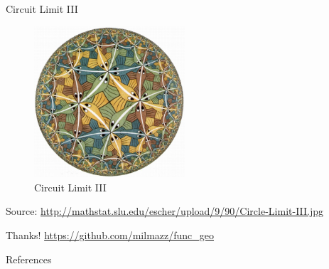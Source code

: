 \documentclass{beamer}
\begin{document}
    \begin{frame}{Circuit Limit III}
        \begin{figure}
            \centering
            \includegraphics[width=0.5\textwidth]{./figs/Circle-Limit-III}
            \caption{Circuit Limit III}
            \label{fig:circuit_limit_iii}
        \end{figure}
        {\tiny Source: \url{http://mathstat.slu.edu/escher/upload/9/90/Circle-Limit-III.jpg}}
    \end{frame}

    \begin{frame}[standout]
        Thanks!
        \url{https://github.com/milmazz/func\_geo}
    \end{frame}

    \begin{frame}[allowframebreaks]{References}
        
        
    \end{frame}
\end{document}
